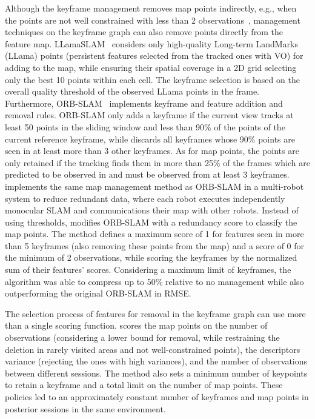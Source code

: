 Although the keyframe management removes map points indirectly, e.g., when the points are not well constrained with less than 2 observations~\parencite{schmuck-chli:2019:00071}, management techniques on the keyframe graph can also remove points directly from the feature map.
LLamaSLAM~\parencite{luthardt-et-al:2018:8569323} considers only high-quality Long-term LandMarks (LLama) points (persistent features selected from the tracked ones with VO) for adding to the map, while ensuring their spatial coverage in a 2D grid selecting only the best 10 points within each cell. The keyframe selection is based on the overall quality threshold of the observed LLama points in the frame.
Furthermore, ORB-SLAM~\parencite{mur-artal-et-al:2015:2463671} implements keyframe and feature addition and removal rules. ORB-SLAM only adds a keyframe if the current view tracks at least 50 points in the sliding window and less than 90\% of the points of the current reference keyframe, while discards all keyframes whose 90\% points are seen in at least more than 3 other keyframes. As for map points, the points are only retained if the tracking finds them in more than 25\% of the frames which are predicted to be observed in and must be observed from at least 3 keyframes.
\cite{zhang-et-al:2018:1729881418780178} implements the same map management method as ORB-SLAM in a multi-robot system to reduce redundant data, where each robot executes independently monocular SLAM and communications their map with other robots.
Instead of using thresholds, \cite{schmuck-chli:2019:00071} modifies ORB-SLAM with a redundancy score to classify the map points. The method defines a maximum score of 1 for features seen in more than 5 keyframes (also removing these points from the map) and a score of 0 for the minimum of 2 observations, while scoring the keyframes by the normalized sum of their features' scores. Considering a maximum limit of keyframes, the algorithm was able to compress up to 50\% relative to no management while also outperforming the original ORB-SLAM in RMSE.

The selection process of features for removal in the keyframe graph can use more than a single scoring function.
\cite{dymczyk-et-al:2015:7139575} scores the map points on the number of observations (considering a lower bound for removal, while restraining the deletion in rarely visited areas and not well-constrained points), the descriptors variance (rejecting the ones with high variances), and the number of observations between different sessions. The method also sets a minimum number of keypoints to retain a keyframe and a total limit on the number of map points. These policies led to an approximately constant number of keyframes and map points in posterior sessions in the same environment.


